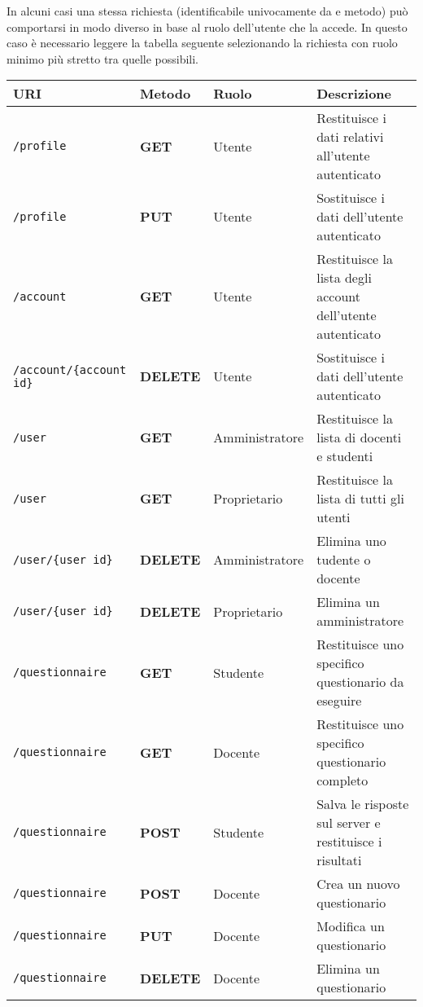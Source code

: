 \documentclass[12pt,a4paper]{article}
\begin{document}
In alcuni casi una stessa richiesta (identificabile univocamente da  e metodo) può comportarsi
in modo diverso in base al ruolo dell'utente che la accede. In questo caso è necessario leggere la tabella
seguente selezionando la richiesta con ruolo minimo più stretto tra quelle possibili.

\begin{center}
	\begin{longtable}[H]{p{} p{} p{} p{}}
		\toprule
		\textbf{URI} & \textbf{Metodo} & \textbf{Ruolo} & \textbf{Descrizione}\\*

		\midrule
		\midrule
		\texttt{/profile} & \textbf{GET} & Utente & Restituisce i dati relativi all'utente autenticato \\*
		\midrule
		\texttt{/profile} & \textbf{PUT} & Utente & Sostituisce i dati dell'utente autenticato \\*

		\midrule
		\midrule
		\texttt{/account} & \textbf{GET} & Utente & Restituisce la lista degli account dell'utente autenticato \\*
		\midrule
        \texttt{/account/\{account id\}} & \textbf{DELETE} & Utente & Sostituisce i dati dell'utente autenticato \\*

		\midrule
		\midrule
		\texttt{/user} & \textbf{GET} & Amministratore & Restituisce la lista di docenti e studenti \\*
		\midrule
		\texttt{/user} & \textbf{GET} & Proprietario & Restituisce la lista di tutti gli utenti \\*
		\midrule
        \texttt{/user/\{user id\}} & \textbf{DELETE} & Amministratore & Elimina uno tudente o docente \\*
		\midrule
        \texttt{/user/\{user id\}} & \textbf{DELETE} & Proprietario & Elimina un amministratore \\*

		\midrule
		\midrule
		\texttt{/questionnaire} & \textbf{GET} & Studente & Restituisce uno specifico questionario da eseguire \\*
		\midrule
		\texttt{/questionnaire} & \textbf{GET} & Docente & Restituisce uno specifico questionario completo \\*
		\midrule
		\texttt{/questionnaire} & \textbf{POST} & Studente & Salva le risposte sul server e restituisce i risultati \\*
		\midrule
		\texttt{/questionnaire} & \textbf{POST} & Docente & Crea un nuovo questionario \\*
		\midrule
		\texttt{/questionnaire} & \textbf{PUT} & Docente & Modifica un questionario \\*
		\midrule
		\texttt{/questionnaire} & \textbf{DELETE} & Docente & Elimina un questionario \\*
		

\end{longtable}
\end{center}
\end{document}
